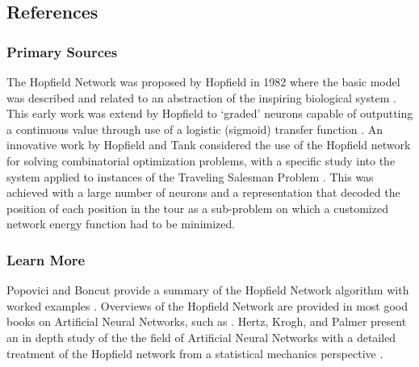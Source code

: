 \subsection{References}

% 
% 
\subsubsection{Primary Sources}
The Hopfield Network was proposed by Hopfield in 1982 where the basic model was described and related to an abstraction of the inspiring biological system \cite{Hopfield1982}.
This early work was extend by Hopfield to `graded' neurons capable of outputting a continuous value through use of a logistic (sigmoid) transfer function \cite{Hopfield1984}.
An innovative work by Hopfield and Tank considered the use of the Hopfield network for solving combinatorial optimization problems, with a specific study into the system applied to instances of the Traveling Salesman Problem \cite{Hopfield1985}. This was achieved with a large number of neurons and a representation that decoded the position of each position in the tour as a sub-problem on which a customized network energy function had to be minimized.

% 
% 
\subsubsection{Learn More}
Popovici and Boncut provide a summary of the Hopfield Network algorithm with worked examples \cite{Popovici2005}.
Overviews of the Hopfield Network are provided in most good books on Artificial Neural Networks, such as \cite{Rojas1996}.
Hertz, Krogh, and Palmer present an in depth study of the the field of Artificial Neural Networks with a detailed treatment of the Hopfield network from a statistical mechanics perspective \cite{Hertz1991}.



